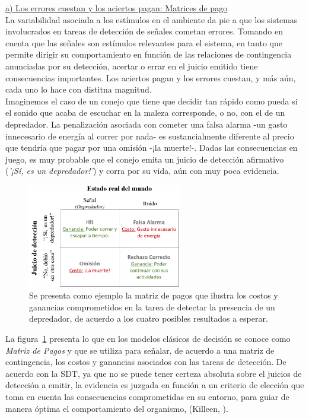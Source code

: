       \underline{a) Los errores cuestan y los aciertos pagan: Matrices de pago}\\

La variabilidad asociada a los estímulos en el ambiente da pie a que los sistemas involucrados en tareas de detección de señales cometan errores. Tomando en cuenta que las señales son estímulos relevantes para el sistema, en tanto que permite dirigir su comportamiento en función de las relaciones de contingencia anunciadas por su detección, acertar o errar en el juicio emitido tiene consecuencias importantes. Los aciertos pagan y los errores cuestan, y más aún, cada uno lo hace con distitna magnitud.\\

Imaginemos el caso de un conejo que tiene que decidir tan rápido como pueda si el sonido que acaba de escuchar en la maleza corresponde, o no, con el de un depredador. La penalización asociada con cometer una falsa alarma -un gasto innecesario de energía al correr por nada- es sustancialmente diferente al precio que tendría que pagar por una omisión -¡la muerte!-. Dadas las consecuencias en juego, es muy probable que el conejo emita un juicio de detección afirmativo (\textit{'¡Sí, es un depredador!'}) y corra por su vida, aún con muy poca evidencia.\\

\begin{figure}[th]
\centering
\includegraphics[width=0.60\textwidth]{Figures/Matriz_Pagos} 
\caption[Ejemplo de Matriz de Pagos]{Se presenta como ejemplo la matriz de pagos que ilustra los costos y ganancias comprometidos en la tarea de detectar la presencia de un depredador, de acuerdo a los cuatro posibles resultados a esperar.}
\label{fig:Mat_Pagos}
\end{figure}

La figura~\ref{fig:Mat_Pagos} presenta lo que en los modelos clásicos de decisión se conoce como \textit{Matriz de Pagos} y que se utiliza para señalar, de acuerdo a una matriz de contingencia, los costos y ganancias asociados con las tareas de detección. De acuerdo con la SDT, ya que no se puede tener certeza absoluta sobre el juicios de detección a emitir, la evidencia es juzgada en función a un criterio de elección que toma en cuenta las consecuencias comprometidas en su entorno, para guiar de manera óptima el comportamiento del organismo, (Killeen, \citeyear{Killeen2014}).\\

